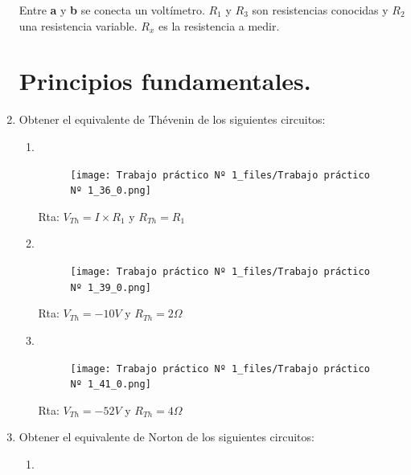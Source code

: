 \documentclass[10pt,a4paper]{article}
\begin{document}
\begin{enumerate}
Entre \textbf{a} y \textbf{b} se conecta un voltímetro. $R_{1}$ y $R_{3}$ son resistencias conocidas y $R_{2}$ una resistencia variable. $R_{x}$ es la resistencia a medir.


\section*{Principios fundamentales.}






\item Obtener el equivalente de Thévenin de los siguientes circuitos:

\begin{enumerate}
	\item \
	
\begin{figure}[H]
	\centering
	\texttt{[image: Trabajo práctico Nº 1\_files/Trabajo práctico Nº 1\_36\_0.png]}
	\label{e9a}
\end{figure}

Rta: $V_{Th}=I \times R_{1}$ y $R_{Th}= R_1$
	
	\item \
	
\begin{figure}[H]
	\centering
	\texttt{[image: Trabajo práctico Nº 1\_files/Trabajo práctico Nº 1\_39\_0.png]}
	\label{e9b}
\end{figure}

Rta: $V_{Th}=-10V$ y $R_{Th}=2\Omega$

\item \

\begin{figure}[H]
	\centering
	\texttt{[image: Trabajo práctico Nº 1\_files/Trabajo práctico Nº 1\_41\_0.png]}
	\label{e9c}
\end{figure}

Rta: $V_{Th}=-52V$ y $R_{Th}=4\Omega$

\end{enumerate}

\item Obtener el equivalente de Norton de los siguientes circuitos:

\begin{enumerate}
	\item \


\end{enumerate}
\end{enumerate}
\end{document}
